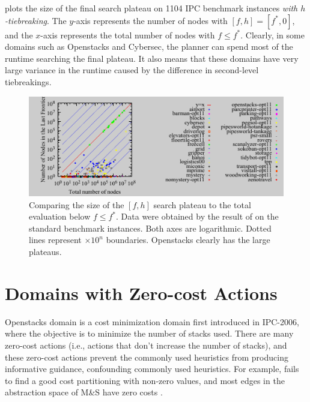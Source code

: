  plots the size of the final search plateau on 1104 IPC
benchmark instances \emph{with $h$-tiebreaking}.
The $y$-axis
represents the number of nodes with $[f,h]=[f^*,0]$, and the $x$-axis represents the total
number of nodes with $f\leq f^*$.
Clearly, in some domains such as Openstacks and Cybersec, the planner can spend most of the runtime
searching the final plateau.
It also
means that these domains have very large variance in the runtime caused
by the difference in second-level tiebreakings. 




\begin{figure}[tb]
 \centering {}
  \includegraphics{tables/aaai16-frontier/aaai16prelim3/lmcut_frontier-front.pdf}
  \caption{Comparing the size of the $[f,h]$ search plateau to the total
  evaluation below $f\leq f^*$. Data were obtained by the result of
  \lmcut on the standard benchmark instances. Both axes are
  logarithmic. Dotted lines represent $\times 10^n$ boundaries.
  Openstacks clearly has the large plateaus.}  \label{plateau}
\end{figure}

\section{Domains with Zero-cost Actions}

Openstacks domain is a cost
minimization domain first introduced in IPC-2006, where the objective is to 
minimize the number of stacks used.
There are many zero-cost actions (i.e., actions that don't increase the number of stacks), and
these zero-cost actions prevent the commonly used heuristics from producing
informative guidance, confounding commonly used heuristics.
For example, \lmcut \cite{Helmert2009} fails to find a good cost
partitioning with non-zero values, 
and most edges in the abstraction
space of M\&S have zero costs \cite{helmert2007flexible}.

